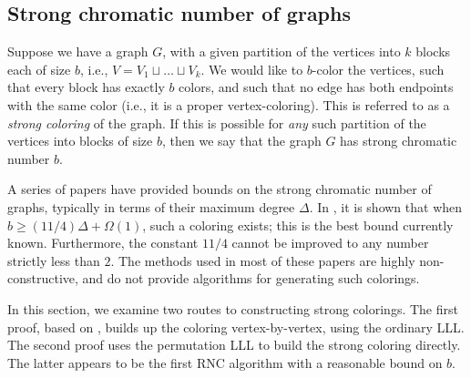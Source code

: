 \subsection{Strong chromatic number of graphs}
Suppose we have a graph $G$, with a given partition of the vertices into $k$ blocks each of size $b$, i.e., $V = V_1 \sqcup \dots \sqcup V_k$. We would like to $b$-color the vertices, such that every block has exactly $b$ colors, and such that no edge has both endpoints with the same color (i.e., it is a proper vertex-coloring). This is referred to as a \emph{strong coloring} of the graph. If this is possible for \emph{any} such partition of the vertices into blocks of size $b$, then we say that the graph $G$ has strong chromatic number $b$.

A series  of papers \cite{alon1992,axenovich,fellows,haxell2004} have provided bounds on the strong chromatic number of graphs, typically in terms of their maximum degree $\Delta$. In \cite{haxell2008}, it is shown that when $b \geq (11/4) \Delta + \Omega(1)$, such a coloring exists; this is the best bound currently known. Furthermore, the constant $11/4$ cannot be improved to any number strictly less than $2$. The methods used in most of these papers are highly non-constructive, and do not provide algorithms for generating such colorings. 

In this section, we examine two routes to constructing strong colorings. The first proof, based on \cite{aharoni}, builds up the coloring vertex-by-vertex, using the ordinary LLL. The second proof uses the permutation LLL to build the strong coloring directly. 
The latter appears to be the first RNC algorithm with a reasonable bound on $b$.  

